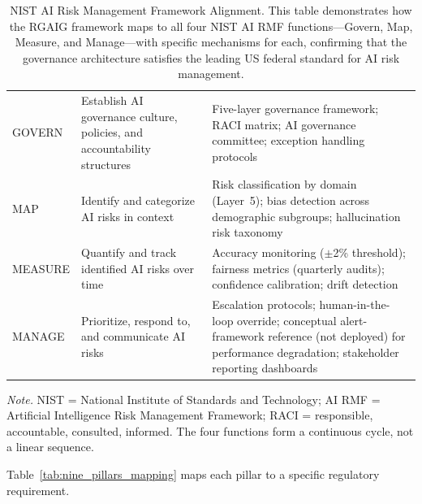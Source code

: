 \begin{table}[H]
\tablestripes\tablefontsize
\tablefontsize
\caption[NIST AI Risk Management Framework Alignment]{NIST AI Risk Management Framework Alignment. This table demonstrates how the RGAIG framework maps to all four NIST AI RMF functions---Govern, Map, Measure, and Manage---with specific mechanisms for each, confirming that the governance architecture satisfies the leading US federal standard for AI risk management.}
\begin{tabularx}{\textwidth}{@{} p{2cm} L L @{}}
\toprule
{} &  &  \\
\midrule
GOVERN & Establish AI governance culture, policies, and accountability structures & Five-layer governance framework; RACI matrix; AI governance committee; exception handling protocols \\
\addlinespace
MAP & Identify and categorize AI risks in context & Risk classification by domain (Layer~5); bias detection across demographic subgroups; hallucination risk taxonomy \\
\addlinespace
MEASURE & Quantify and track identified AI risks over time & Accuracy monitoring ($\pm$2\% threshold); fairness metrics (quarterly audits); confidence calibration; drift detection \\
\addlinespace
MANAGE & Prioritize, respond to, and communicate AI risks & Escalation protocols; human-in-the-loop override; conceptual alert-framework reference (not deployed) for performance degradation; stakeholder reporting dashboards \\
\bottomrule
\end{tabularx}
\vspace{0.5em}\noindent\textit{Note.} NIST = National Institute of Standards and Technology; AI RMF = Artificial Intelligence Risk Management Framework; RACI = responsible, accountable, consulted, informed. The four functions form a continuous cycle, not a linear sequence.
\end{table}

Table~\ref{tab:nine_pillars_mapping} maps each pillar to a specific regulatory requirement.

